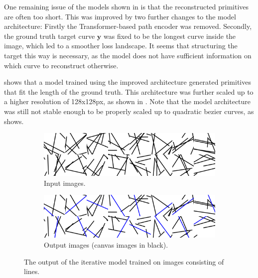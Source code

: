 One remaining issue of the models shown in  is that the reconstructed primitives are often too short. This was improved by two further changes to the model architecture: Firstly the Transformer-based \citep{DBLP:conf/nips/VaswaniSPUJGKP17} path encoder was removed. Secondly, the ground truth target curve $\mathbf{y}$ was fixed to be the longest curve inside the image, which led to a smoother loss landscape. It seems that structuring the target this way is necessary, as the model does not have sufficient information on which curve to reconstruct otherwise.

 shows that a model trained using the improved architecture generated primitives that fit the length of the ground truth. This architecture was further scaled up to a higher resolution of 128x128px, as shown in . Note that the model architecture was still not stable enough to be properly scaled up to quadratic bezier curves, as  shows.

\begin{figure}
    \centering
    \begin{subfigure}{.45\textwidth}
        \includegraphics[width=\textwidth]{graphics/work-artifacts/iterative/server/156/real_images.png}
        \caption{Input images.}
    \end{subfigure}
    \begin{subfigure}{.45\textwidth}
        \includegraphics[width=\textwidth]{graphics/work-artifacts/iterative/server/156/generated_images.png}
        \caption{Output images (canvas images in black).}
    \end{subfigure}
    \caption{The output of the iterative model trained on images consisting of lines.}
    \label{fig:iterative.server.156.recons}
\end{figure}

